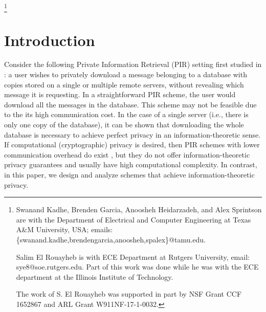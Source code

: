 \documentclass[letterpaper, 10 pt, conference]{ieeeconf}
\newcommand\salim[1]{\add[salim]{#1}}
\newcommand\blfootnote[1]{%
  \begingroup
  \renewcommand\thefootnote{}\footnote{#1}%
  \addtocounter{footnote}{-1}%
  \endgroup
}
\begin{document}
\blfootnote{Swanand Kadhe, Brenden Garcia, Anoosheh Heidarzadeh, and Alex Sprintson are with the Department of Electrical and Computer Engineering at Texas A\&M University, USA; emails:\{swanand.kadhe,brendengarcia,anoosheh,spalex\}@tamu.edu. 

Salim El Rouayheb is with ECE Department  at Rutgers University, email: sye8@soe.rutgers.edu. Part of this work was done while he was with the ECE department at the Illinois Institute of Technology.


 The work of S. El Rouayheb  was supported in part by NSF Grant CCF 1652867 and ARL Grant W911NF-17-1-0032.}


\section{Introduction}
\label{sec:intro}



Consider the following Private Information Retrieval (PIR) setting first studied in \cite{Chor:PIR1995,chor1998private}:  a user  wishes to privately download  a message belonging to a database with copies stored on a single or   multiple remote servers, without revealing which message it is requesting. 
In a straightforward PIR scheme, the user would  download all the messages in  the database. This scheme may not be feasible due to the its high communication cost. In the case of a single server (i.e., there is only one copy of the database),  it can be shown that downloading  the whole database is necessary to achieve perfect privacy in an information-theoretic sense. If computational (cryptographic) privacy is desired, then PIR schemes with lower communication overhead do exist \cite{kushilevitz1997replication, cPIRPoly}, but they do not offer information-theoretic privacy guarantees and usually have high computational complexity. In contrast, in this paper, we design and analyze schemes that achieve information-theoretic privacy.
\end{document}
